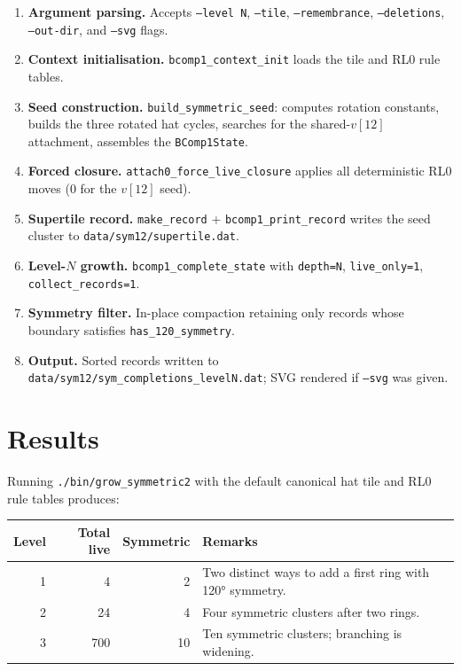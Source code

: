 \documentclass[10pt,a4paper]{article}
\let\polysection\section
\renewcommand\section{\needspace{0.16\textheight}\polysection}
\newcommand{\code}[1]{\texttt{\small #1}}
\newcommand{\file}[1]{\texttt{\footnotesize #1}}
\begin{document}
\begin{enumerate}
  \item \textbf{Argument parsing.}  Accepts \code{--level N},
    \code{--tile}, \code{--remembrance}, \code{--deletions},
    \code{--out-dir}, and \code{--svg} flags.
  \item \textbf{Context initialisation.}  \code{bcomp1\_context\_init}
    loads the tile and RL0 rule tables.
  \item \textbf{Seed construction.}  \code{build\_symmetric\_seed}:
    computes rotation constants, builds the three rotated hat cycles,
    searches for the shared-$v[12]$ attachment, assembles the
    \code{BComp1State}.
  \item \textbf{Forced closure.}  \code{attach0\_force\_live\_closure}
    applies all deterministic RL0 moves (0 for the $v[12]$ seed).
  \item \textbf{Supertile record.}  \code{make\_record} + \code{bcomp1\_print\_record}
    writes the seed cluster to \file{data/sym12/supertile.dat}.
  \item \textbf{Level-$N$ growth.}  \code{bcomp1\_complete\_state} with
    \code{depth=N}, \code{live\_only=1}, \code{collect\_records=1}.
  \item \textbf{Symmetry filter.}  In-place compaction retaining only
    records whose boundary satisfies \code{has\_120\_symmetry}.
  \item \textbf{Output.}  Sorted records written to
    \file{data/sym12/sym\_completions\_levelN.dat}; SVG rendered if
    \code{--svg} was given.
\end{enumerate}

\section{Results}

Running \code{./bin/grow\_symmetric2} with the default canonical hat tile
and RL0 rule tables produces:

\medskip
\begin{tabular}{@{}rrrp{8cm}@{}}
\toprule
\textbf{Level} & \textbf{Total live} & \textbf{Symmetric} & \textbf{Remarks} \\
\midrule
1 & 4  & 2  & Two distinct ways to add a first ring with 120° symmetry. \\
2 & 24 & 4  & Four symmetric clusters after two rings. \\
3 & 700 & 10 & Ten symmetric clusters; branching is widening. \\
\bottomrule
\end{tabular}
\end{document}
